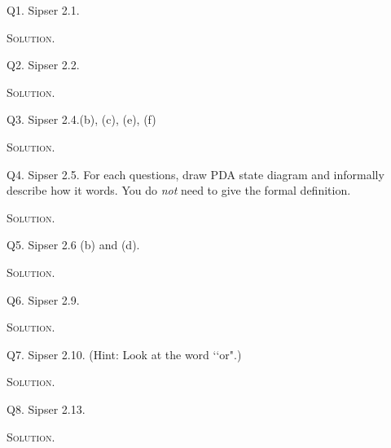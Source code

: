 \newpage
Q1. Sipser 2.1. 

\textsc{Solution}.



\newpage
Q2. Sipser 2.2.

\textsc{Solution}.



\newpage
Q3. Sipser 2.4.(b), (c), (e), (f)

\textsc{Solution}.



\newpage
Q4. Sipser 2.5. For each questions, draw PDA state diagram and
informally describe how it words.
You do \textit{not} need to give the formal definition.

\textsc{Solution}.



\newpage
Q5. Sipser 2.6 (b) and (d).

\textsc{Solution}.



\newpage
Q6. Sipser 2.9.

\textsc{Solution}.



\newpage
Q7. Sipser 2.10. (Hint: Look at the word \lq\lq or".)

\textsc{Solution}.



\newpage
Q8. Sipser 2.13.

\textsc{Solution}.




